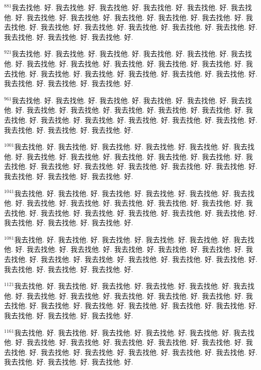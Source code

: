 \documentclass{book}
\begin{document}
$^{881}$我去找他.
好.
我去找他.
好.
我去找他.
好.
我去找他.
好.
我去找他.
好.
我去找他.
好.
我去找他.
好.
我去找他.
好.
我去找他.
好.
我去找他.
好.
我去找他.
好.
我去找他.
好.
我去找他.
好.
我去找他.
好.
我去找他.
好.
我去找他.
好.
我去找他.
好.
我去找他.
好.
我去找他.
好.
我去找他.
好.

$^{921}$我去找他.
好.
我去找他.
好.
我去找他.
好.
我去找他.
好.
我去找他.
好.
我去找他.
好.
我去找他.
好.
我去找他.
好.
我去找他.
好.
我去找他.
好.
我去找他.
好.
我去找他.
好.
我去找他.
好.
我去找他.
好.
我去找他.
好.
我去找他.
好.
我去找他.
好.
我去找他.
好.
我去找他.
好.
我去找他.
好.

$^{961}$我去找他.
好.
我去找他.
好.
我去找他.
好.
我去找他.
好.
我去找他.
好.
我去找他.
好.
我去找他.
好.
我去找他.
好.
我去找他.
好.
我去找他.
好.
我去找他.
好.
我去找他.
好.
我去找他.
好.
我去找他.
好.
我去找他.
好.
我去找他.
好.
我去找他.
好.
我去找他.
好.
我去找他.
好.
我去找他.
好.

$^{1001}$我去找他.
好.
我去找他.
好.
我去找他.
好.
我去找他.
好.
我去找他.
好.
我去找他.
好.
我去找他.
好.
我去找他.
好.
我去找他.
好.
我去找他.
好.
我去找他.
好.
我去找他.
好.
我去找他.
好.
我去找他.
好.
我去找他.
好.
我去找他.
好.
我去找他.
好.
我去找他.
好.
我去找他.
好.
我去找他.
好.

$^{1041}$我去找他.
好.
我去找他.
好.
我去找他.
好.
我去找他.
好.
我去找他.
好.
我去找他.
好.
我去找他.
好.
我去找他.
好.
我去找他.
好.
我去找他.
好.
我去找他.
好.
我去找他.
好.
我去找他.
好.
我去找他.
好.
我去找他.
好.
我去找他.
好.
我去找他.
好.
我去找他.
好.
我去找他.
好.
我去找他.
好.

$^{1081}$我去找他.
好.
我去找他.
好.
我去找他.
好.
我去找他.
好.
我去找他.
好.
我去找他.
好.
我去找他.
好.
我去找他.
好.
我去找他.
好.
我去找他.
好.
我去找他.
好.
我去找他.
好.
我去找他.
好.
我去找他.
好.
我去找他.
好.
我去找他.
好.
我去找他.
好.
我去找他.
好.
我去找他.
好.
我去找他.
好.

$^{1121}$我去找他.
好.
我去找他.
好.
我去找他.
好.
我去找他.
好.
我去找他.
好.
我去找他.
好.
我去找他.
好.
我去找他.
好.
我去找他.
好.
我去找他.
好.
我去找他.
好.
我去找他.
好.
我去找他.
好.
我去找他.
好.
我去找他.
好.
我去找他.
好.
我去找他.
好.
我去找他.
好.
我去找他.
好.
我去找他.
好.

$^{1161}$我去找他.
好.
我去找他.
好.
我去找他.
好.
我去找他.
好.
我去找他.
好.
我去找他.
好.
我去找他.
好.
我去找他.
好.
我去找他.
好.
我去找他.
好.
我去找他.
好.
我去找他.
好.
我去找他.
好.
我去找他.
好.
我去找他.
好.
我去找他.
好.
我去找他.
好.
我去找他.
好.
我去找他.
好.
我去找他.
好.
\end{document}
